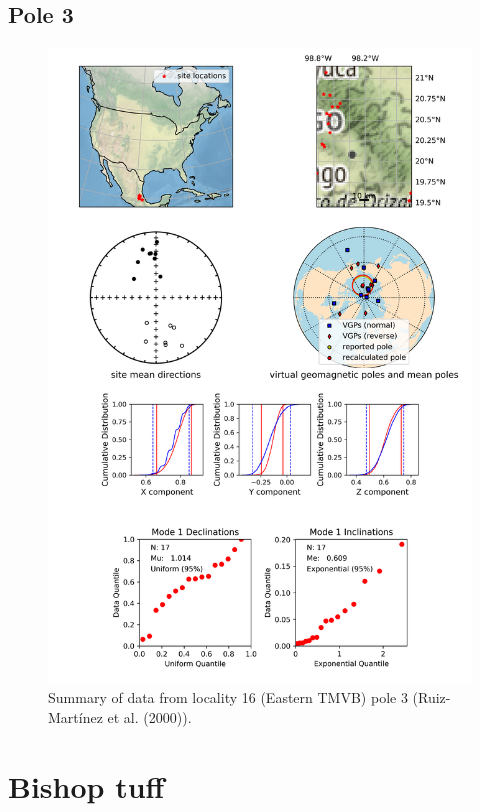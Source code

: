 \documentclass{article}
\begin{document}
\subsection{Pole 3}


\begin{figure}[H]
\centering
\includegraphics[width=5 in]{./16/3/pole_summary.png}
\caption{Summary of data from locality 16 (Eastern TMVB) pole 3 (Ruiz-Martínez et al. (2000)).}
\end{figure}

\section{Bishop tuff}
\end{document}
